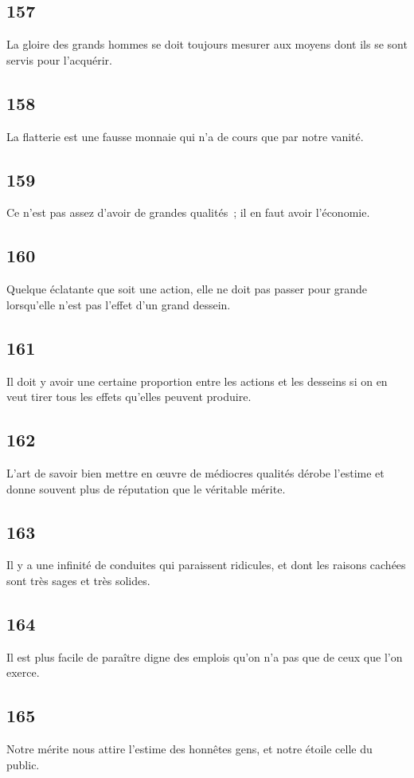 \documentclass[french,twoside]{book} %
\begin{document}
\subsection[{157}]{ \textsc{157} }
\noindent La gloire des grands hommes se doit toujours mesurer aux moyens dont ils se sont servis pour l’acquérir.
\subsection[{158}]{ \textsc{158} }
\noindent La flatterie est une fausse monnaie qui n’a de cours que par notre vanité.
\subsection[{159}]{ \textsc{159} }
\noindent Ce n’est pas assez d’avoir de grandes qualités ; il en faut avoir l’économie.
\subsection[{160}]{ \textsc{160} }
\noindent Quelque éclatante que soit une action, elle ne doit pas passer pour grande lorsqu’elle n’est pas l’effet d’un grand dessein.
\subsection[{161}]{ \textsc{161} }
\noindent Il doit y avoir une certaine proportion entre les actions et les desseins si on en veut tirer tous les effets qu’elles peuvent produire.
\subsection[{162}]{ \textsc{162} }
\noindent L’art de savoir bien mettre en œuvre de médiocres qualités dérobe l’estime et donne souvent plus de réputation que le véritable mérite.
\subsection[{163}]{ \textsc{163} }
\noindent Il y a une infinité de conduites qui paraissent ridicules, et dont les raisons cachées sont très sages et très solides.
\subsection[{164}]{ \textsc{164} }
\noindent Il est plus facile de paraître digne des emplois qu’on n’a pas que de ceux que l’on exerce.
\subsection[{165}]{ \textsc{165} }
\noindent Notre mérite nous attire l’estime des honnêtes gens, et notre étoile celle du public.
\end{document}

